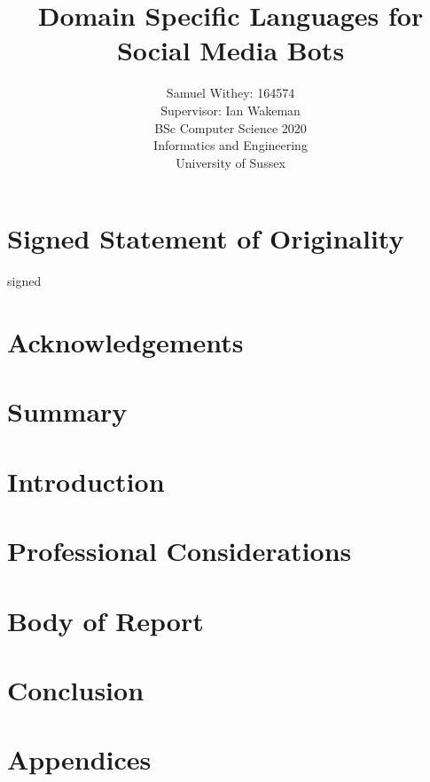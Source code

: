\documentclass{article}
\title{ \LARGE Domain Specific Languages for Social Media Bots}
\author{Samuel Withey: 164574 \\
    Supervisor: Ian Wakeman \\
    BSc Computer Science 2020 \\
    Informatics and Engineering \\
    University of Sussex}
\date{}
\begin{document}
\maketitle

\newpage

\section{Signed Statement of Originality}

signed

\newpage

\section{Acknowledgements}

\newpage

\section{Summary}

\newpage

\tableofcontents

\newpage

\section{Introduction}

\newpage

\section{Professional Considerations}

\newpage

\section{Body of Report}

\newpage

\section{Conclusion}

\newpage



\newpage

\section{Appendices}
\end{document}
